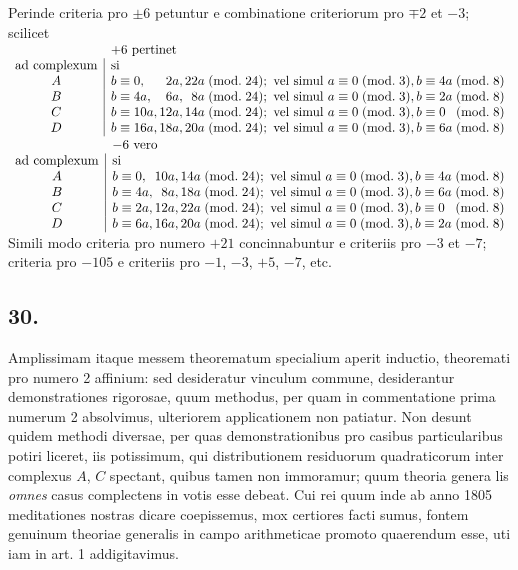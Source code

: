 \documentclass[twoside,12pt]{memoir}
\renewcommand{\pmod}[1]{\;(\textrm{mod.}\;#1)}
\begin{document}
Perinde criteria pro \(\pm 6\) petuntur e combinatione criteriorum pro \(\mp 2\) et \(-3\); scilicet\\
\(\begin{array}{c|l}
\multicolumn{1}{c}{}&\multicolumn{1}{l}{+6\text{ pertinet}}\\
\text{ad complexum}&\text{si}\\
A & b \equiv 0, \phantom{00a}2a, 22a \pmod{24}; \text{ vel simul } a \equiv 0 \pmod{3}, b \equiv 4a \pmod{8} \\
B & b \equiv 4a, \phantom{00}6a, \phantom{0}8a \pmod{24}; \text{ vel simul } a \equiv 0 \pmod{3}, b \equiv 2a \pmod{8} \\
C & b \equiv 10a, 12a, 14a \pmod{24}; \text{ vel simul } a \equiv 0 \pmod{3}, b \equiv 0\phantom{a} \pmod{8} \\
D & b \equiv 16a, 18a, 20a \pmod{24}; \text{ vel simul } a \equiv 0 \pmod{3}, b \equiv 6a \pmod{8}
\end{array}\)\\
\(\begin{array}{c|l}
\multicolumn{1}{c}{}&\multicolumn{1}{l}{-6\text{ vero}}\\
\text{ad complexum}&\text{si}\\
A & b \equiv 0,\phantom{a} 10a, 14a \pmod{24}; \text{ vel simul } a \equiv 0 \pmod{3}, b \equiv 4a \pmod{8} \\
B & b \equiv 4a, \phantom{0}8a, 18a \pmod{24}; \text{ vel simul } a \equiv 0 \pmod{3}, b \equiv 6a \pmod{8} \\
C & b \equiv 2a, 12a, 22a \pmod{24}; \text{ vel simul } a \equiv 0 \pmod{3}, b \equiv 0\phantom{a} \pmod{8} \\
D & b \equiv 6a, 16a, 20a \pmod{24}; \text{ vel simul } a \equiv 0 \pmod{3}, b \equiv 2a \pmod{8}
\end{array}\)\\
 
Simili modo criteria pro numero \(+21\) concinnabuntur e criteriis pro \(-3\) et \(-7\); criteria pro \(-105\) e criteriis pro \(-1\), \(-3\), \(+5\), \(-7\), etc.

\subsection*{30.}
 
Amplissimam itaque messem theorematum specialium aperit inductio, theoremati pro numero 2 affinium: sed desideratur vinculum commune, desiderantur demonstrationes rigorosae, quum methodus, per quam in commentatione prima numerum 2 absolvimus, ulteriorem applicationem non patiatur. Non desunt quidem methodi diversae, per quas demonstrationibus pro casibus particularibus potiri liceret, iis potissimum, qui distributionem residuorum quadraticorum inter complexus \(A\), \(C\) spectant, quibus tamen non immoramur; quum theoria genera\pagebreak%
lis \textit{omnes} casus complectens in votis esse debeat. Cui rei quum inde ab anno 1805 meditationes nostras dicare coepissemus, mox certiores facti sumus, fontem genuinum theoriae generalis in campo arithmeticae promoto quaerendum esse, uti iam in art. 1 addigitavimus.
 
\end{document}
